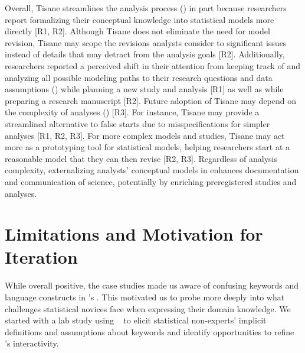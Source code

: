 Overall, Tisane streamlines the analysis process (\rqWorkflow) in part because
researchers report formalizing their conceptual knowledge into statistical
models more directly [R1, R2]. Although Tisane does not eliminate the need for
model revision, Tisane may scope the revisions analysts consider to significant
issues instead of details that may detract from the analysis goals [R2].
Additionally, researchers reported a perceived shift in their attention from
keeping track of and analyzing all possible modeling paths to their research
questions and data assumptions (\rqCognitive) while planning a new study and
analysis [R1] as well as while preparing a research manuscript [R2]. Future
adoption of Tisane may depend on the complexity of analyses (\rqFuture) [R3].
For instance, Tisane may provide a streamlined alternative to false starts due
to misspecifications for simpler analyses [R1, R2, R3]. For more complex models
and studies, Tisane may act more as a prototyping tool for statistical models,
helping researchers start at a reasonable model that they can then revise [R2,
R3]. Regardless of analysis complexity, externalizing analysts' conceptual
models in \tisane enhances documentation and communication of science,
potentially by enriching preregistered studies and analyses.

\section{Limitations and Motivation for Iteration}
While overall positive, the case studies made us aware of confusing keywords and
language constructs in \tisane's \SDSL. This motivated us to probe more deeply
into what challenges statistical novices face when expressing their domain
knowledge. We started with a lab study using
\tisane~\cite{jun2022tisane} to elicit statistical non-experts' implicit
definitions and assumptions about \SDSL keywords and identify
opportunities to refine \tisane's interactivity.


